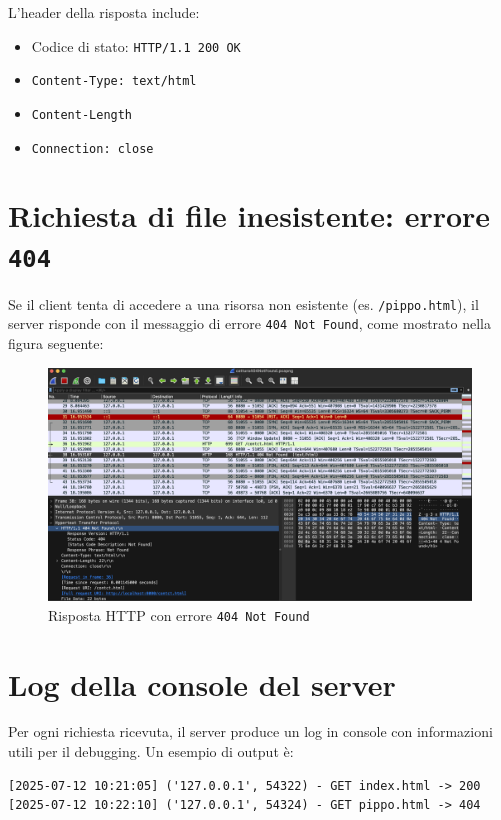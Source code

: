 \documentclass[a4paper,12pt]{report}
\begin{document}
L’header della risposta include:
\begin{itemize}
    \item Codice di stato: \texttt{HTTP/1.1 200 OK}
    \item \texttt{Content-Type: text/html}
    \item \texttt{Content-Length}
    \item \texttt{Connection: close}
\end{itemize}

\section{Richiesta di file inesistente: errore \texttt{404}}

Se il client tenta di accedere a una risorsa non esistente (es. \texttt{/pippo.html}), il server risponde con il messaggio di errore \texttt{404 Not Found}, come mostrato nella figura seguente:

\begin{figure}[H]
    \centering
    \includegraphics[width=1.0\textwidth]{Images/404NotFound.png}
    \caption{Risposta HTTP con errore \texttt{404 Not Found}}
\end{figure}

\section{Log della console del server}

Per ogni richiesta ricevuta, il server produce un log in console con informazioni utili per il debugging. Un esempio di output è:

\begin{verbatim}
[2025-07-12 10:21:05] ('127.0.0.1', 54322) - GET index.html -> 200
[2025-07-12 10:22:10] ('127.0.0.1', 54324) - GET pippo.html -> 404
\end{verbatim}
\end{document}
